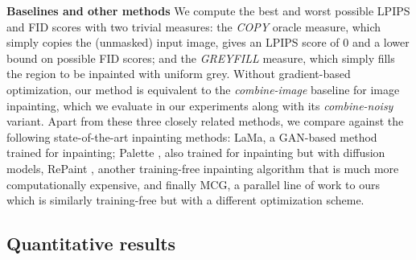 \noindent \textbf{Baselines and other methods} We compute the best and worst possible LPIPS and FID scores with two trivial measures: the \textit{COPY} oracle measure, which simply copies the (unmasked) input image, gives an LPIPS score of $0$ and a lower bound on possible FID scores; and the \textit{GREYFILL} measure, which simply fills the region to be inpainted with uniform grey. Without gradient-based optimization, our method is equivalent to the \textit{combine-image} baseline for image inpainting, which we evaluate in our experiments along with its \textit{combine-noisy} variant. Apart from these three closely related methods, we compare against the following state-of-the-art inpainting methods:  LaMa\cite{lama}, a GAN-based method trained for inpainting; Palette \cite{saharia2022palette}, also trained for inpainting but with diffusion models, RePaint \cite{repaint}, another training-free inpainting algorithm that is much more computationally expensive, and finally MCG\cite{mcg}, a parallel line of work to ours which is similarly training-free but with a different optimization scheme. 


\subsection{Quantitative results}


